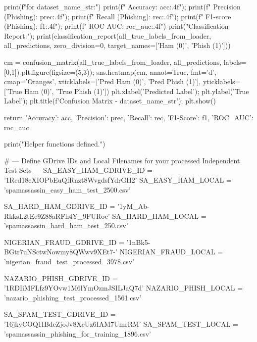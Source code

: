 \begin{ffcode}
    print(f"\nResults for {dataset_name_str}:")
    print(f"  Accuracy:  {acc:.4f}"); print(f"  Precision (Phishing): {prec:.4f}"); print(f"  Recall (Phishing):    {rec:.4f}"); print(f"  F1-score (Phishing):  {f1:.4f}"); print(f"  ROC AUC:   {roc_auc:.4f}")
    print("\n  Classification Report:"); print(classification_report(all_true_labels_from_loader, all_predictions, zero_division=0, target_names=['Ham (0)', 'Phish (1)']))

    cm = confusion_matrix(all_true_labels_from_loader, all_predictions, labels=[0,1])
    plt.figure(figsize=(5,3)); sns.heatmap(cm, annot=True, fmt='d', cmap='Oranges', xticklabels=['Pred Ham (0)', 'Pred Phish (1)'], yticklabels=['True Ham (0)', 'True Phish (1)'])
    plt.xlabel('Predicted Label'); plt.ylabel('True Label'); plt.title(f'Confusion Matrix - {dataset_name_str}'); plt.show()

    return {'Accuracy': acc, 'Precision': prec, 'Recall': rec, 'F1-Score': f1, 'ROC_AUC': roc_auc}

print("Helper functions defined.")

# --- Define GDrive IDs and Local Filenames for your processed Independent Test Sets ---
SA_EASY_HAM_GDRIVE_ID = '1Red18eXIOPbEuQfRnzt8WvgdsfYdrGH2'
SA_EASY_HAM_LOCAL = 'spamassassin_easy_ham_test_2500.csv'

SA_HARD_HAM_GDRIVE_ID = '1yM_Ab-RkksL2tEe9Z88aRFh4Y_9FURoc'
SA_HARD_HAM_LOCAL = 'spamassassin_hard_ham_test_250.csv'

NIGERIAN_FRAUD_GDRIVE_ID = '1nBk5-BGtr7uNSctwNowmy8QWwv9XEt7-'
NIGERIAN_FRAUD_LOCAL = 'nigerian_fraud_test_processed_3978.csv'

NAZARIO_PHISH_GDRIVE_ID = '1RDIiMFLfz9YOvw1M6lYmOzmJSILJaQ7d'
NAZARIO_PHISH_LOCAL = 'nazario_phishing_test_processed_1561.csv'

SA_SPAM_TEST_GDRIVE_ID = '16jkyCOQ1IBdcZjoJv8XeUz6IAM7UmrRM'
SA_SPAM_TEST_LOCAL = 'spamassassin_phishing_for_training_1896.csv'


\end{ffcode}
